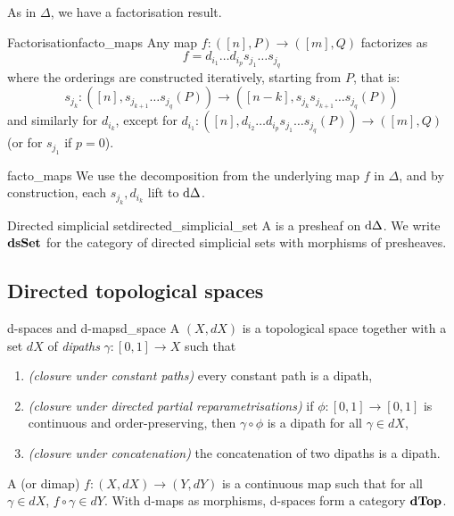 As in \( \Delta \), we have a factorisation result.
\begin{clem}{Factorisation}{facto_maps}
    Any map \( f\colon ([n], P) \to ([m], Q) \) factorizes as 
    \begin{equation*}
    	f = d_{i_1}\dots d_{i_p}s_{j_1}\dots s_{j_q}
    \end{equation*}
    where the orderings are constructed iteratively, starting from \( P \), that is:
    \begin{equation*}
        s_{j_k}\colon ([n], s_{j_{k+1}}\dots s_{j_q}(P)) \to ([n - k], s_{j_k}s_{j_{k+1}}\dots s_{j_q}(P)) 
    \end{equation*}
    and similarly for \( d_{i_k} \), except for \( d_{i_1}\colon ([n], d_{i_2}\dots d_{i_p}s_{j_1}\dots s_{j_q}(P)) \to ([m], Q) \) (or for \( s_{j_1} \) if \( p = 0 \)).
\end{clem} 
\begin{lemproof}{facto_maps}
    We use the decomposition from the underlying map \( f \) in \( \Delta \), and by construction, each \( s_{j_k}, d_{i_k} \) lift to \( \mathrm{d}\Delta \).
\end{lemproof}

\begin{cdef}{Directed simplicial set}{directed_simplicial_set}
	A  is a presheaf on \( \mathrm{d}\Delta \).
	We write \( \mathbf{dsSet} \) for the category of directed simplicial sets with morphisms of presheaves.
\end{cdef}


\subsection{Directed topological spaces}

\begin{cdef}{d-spaces and d-maps}{d_space}
	A  \( (X, dX) \) is a topological space together with a set \( dX \) of \emph{dipaths} \( \gamma\colon [0, 1] \to X \) such that
    \begin{enumerate}
	\item \emph{(closure under constant paths)} every constant path is a dipath,
	\item \emph{(closure under directed partial reparametrisations)}
		if \( \phi\colon [0, 1] \to [0, 1] \) is continuous and order-preserving, then \( \gamma \circ \phi \) is a dipath for all \( \gamma \in dX \),
	\item \emph{(closure under concatenation)} the concatenation of two dipaths is a dipath.
    \end{enumerate}
    A  (or dimap) \( f\colon (X, dX) \to (Y, dY) \) is a continuous map such that for all \( \gamma \in dX \), \( f \circ \gamma \in dY \).
    With d-maps as morphisms, d-spaces form a category \( \mathbf{dTop} \).
\end{cdef}

